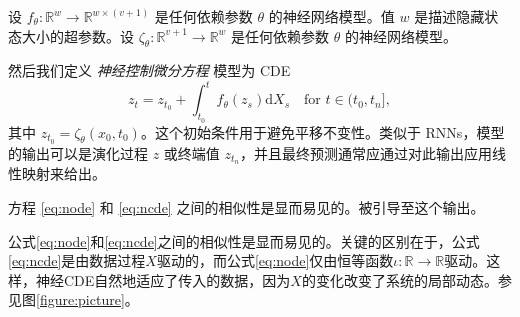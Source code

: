 \documentclass{ctexart}
\theoremstyle{plain}
\theoremstyle{definition}
\newcommand{\reals}{\mathbb{R}}
\begin{document}
	设 $f_\theta \colon \reals^w \to \reals^{w \times (v + 1)}$ 是任何依赖参数 $\theta$ 的神经网络模型。值 $w$ 是描述隐藏状态大小的超参数。设 $\zeta_\theta \colon \reals^{v + 1} \to \reals^w$ 是任何依赖参数 $\theta$ 的神经网络模型。
	
	然后我们定义 \emph{神经控制微分方程} 模型为 CDE
\begin{equation}\label{eq:ncde}
	z_t = z_{t_0} + \int_{t_0}^t f_\theta(z_s) \mathrm{d} X_s\quad\text{for $t \in (t_0, t_n]$},
\end{equation}
	其中 $z_{t_0} = \zeta_\theta(x_0, t_0)$。这个初始条件用于避免平移不变性。类似于 RNNs，模型的输出可以是演化过程 $z$ 或终端值 $z_{t_n}$，并且最终预测通常应通过对此输出应用线性映射来给出。
	
	方程 \eqref{eq:node} 和 \eqref{eq:ncde} 之间的相似性是显而易见的。被引导至这个输出。

公式\eqref{eq:node}和\eqref{eq:ncde}之间的相似性是显而易见的。关键的区别在于，公式\eqref{eq:ncde}是由数据过程$X$驱动的，而公式\eqref{eq:node}仅由恒等函数$\iota \colon \reals \to \reals$驱动。这样，神经CDE自然地适应了传入的数据，因为$X$的变化改变了系统的局部动态。参见图\ref{figure:picture}。
\end{document}
